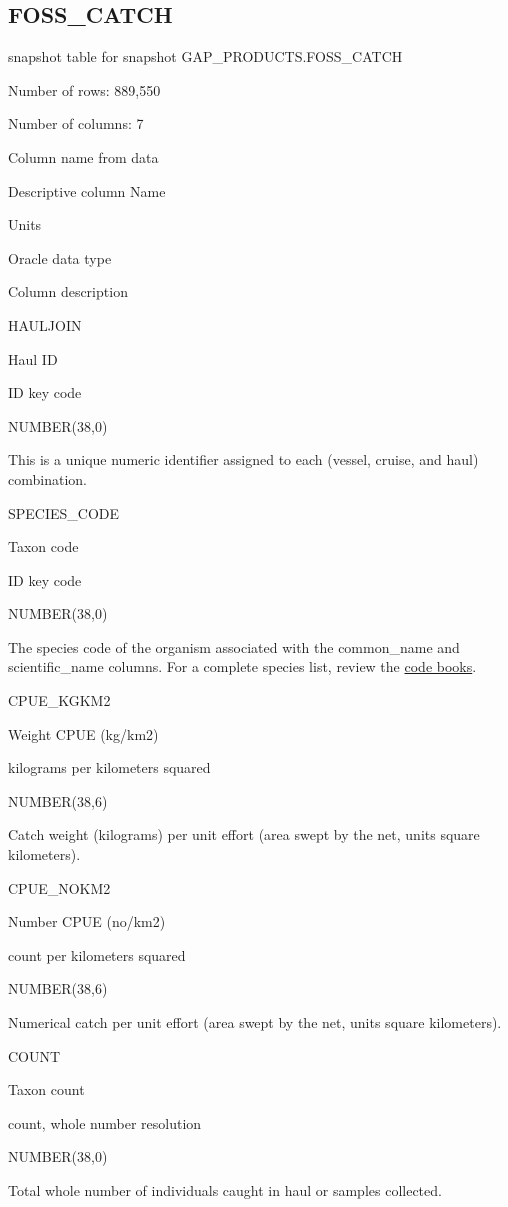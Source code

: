 \documentclass[
  letterpaper,
  oneside,
  open=any]{scrbook}
\begin{document}
\subsection{FOSS\_CATCH}\label{foss_catch}

snapshot table for snapshot GAP\_PRODUCTS.FOSS\_CATCH

Number of rows: 889,550

Number of columns: 7

Column name from data

Descriptive column Name

Units

Oracle data type

Column description

HAULJOIN

Haul ID

ID key code

NUMBER(38,0)

This is a unique numeric identifier assigned to each (vessel, cruise,
and haul) combination.

SPECIES\_CODE

Taxon code

ID key code

NUMBER(38,0)

The species code of the organism associated with the common\_name and
scientific\_name columns. For a complete species list, review the
\href{https://www.fisheries.noaa.gov/resource/document/groundfish-survey-species-code-manual-and-data-codes-manual}{code
books}.

CPUE\_KGKM2

Weight CPUE (kg/km2)

kilograms per kilometers squared

NUMBER(38,6)

Catch weight (kilograms) per unit effort (area swept by the net, units
square kilometers).

CPUE\_NOKM2

Number CPUE (no/km2)

count per kilometers squared

NUMBER(38,6)

Numerical catch per unit effort (area swept by the net, units square
kilometers).

COUNT

Taxon count

count, whole number resolution

NUMBER(38,0)

Total whole number of individuals caught in haul or samples collected.
\end{document}
